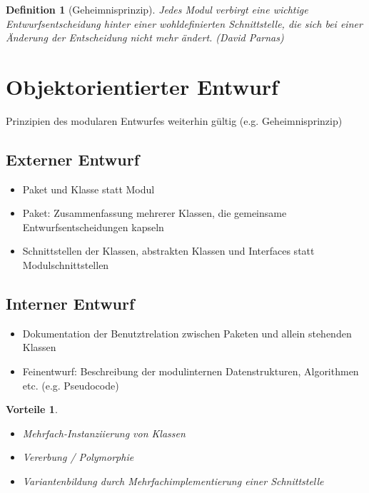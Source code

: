 \documentclass[a4paper]{article}
\theoremstyle{break}
\newtheorem{defi}{Definition}[section]
\newtheorem{why}{Vorteile}[section]
\begin{document}
\begin{defi}[Geheimnisprinzip]
	Jedes Modul verbirgt eine wichtige Entwurfsentscheidung hinter einer wohldefinierten Schnittstelle, die sich bei einer Änderung der Entscheidung nicht mehr ändert. (David Parnas)
\end{defi}

\section{Objektorientierter Entwurf}
	Prinzipien des modularen Entwurfes weiterhin gültig (e.g. Geheimnisprinzip)
\subsection{Externer Entwurf}
\begin{itemize}
	\item Paket und Klasse statt Modul
	\item Paket: Zusammenfassung mehrerer Klassen, die gemeinsame Entwurfsentscheidungen kapseln
	\item Schnittstellen der Klassen, abstrakten Klassen und Interfaces statt Modulschnittstellen
\end{itemize}
\subsection{Interner Entwurf}
\begin{itemize}
	\item Dokumentation der Benutztrelation zwischen Paketen und allein stehenden Klassen
	\item Feinentwurf: Beschreibung der modulinternen Datenstrukturen, Algorithmen etc. (e.g. Pseudocode) 
\end{itemize}	
\begin{why}
	\begin{itemize}
		\item Mehrfach-Instanziierung von Klassen
		\item Vererbung / Polymorphie
		\item Variantenbildung durch Mehrfachimplementierung einer Schnittstelle
	\end{itemize}
\end{why}	
\end{document}
